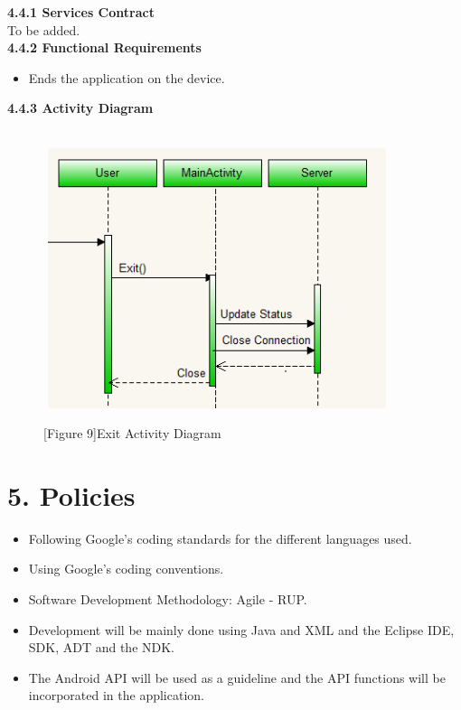 \documentclass[29pt,a4paper]{moderncv}
\begin{document}
		\noindent\textbf{4.4.1 Services Contract}\\ 
		To be added.\\
		\textbf{4.4.2 Functional Requirements}
			\begin{itemize}
				\item Ends the application on the device.\\
			\end{itemize}
		\left\textbf{4.4.3 Activity Diagram}
		\begin{figure}
			\centering
			\\ \includegraphics[width=4.0in, height=3.0in]{./exitActivity.png}
			\\\caption{[Figure 9]Exit Activity Diagram}
		\end{figure}
\newpage
	\section*{\textbf{5. Policies}}
	\vspace{4mm}
		\begin{itemize}
			\item Following Google’s coding standards for the different languages used.
			\item Using Google’s coding conventions.
			\item Software Development Methodology: Agile - RUP.
			\item Development will be mainly done using Java and XML and the Eclipse IDE, SDK, ADT and the NDK.
			\item The Android API will be used as a guideline and the API functions will be incorporated in the application.
			
		\end{itemize}	
	\vspace{5mm}
	
\end{document}
